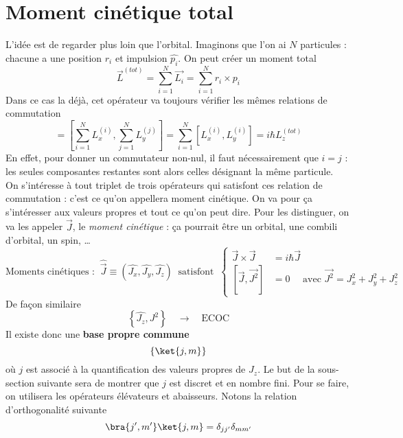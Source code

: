 \section{Moment cinétique total}
L'idée est de regarder plus loin que l'orbital. Imaginons que l'on ai $N$ particules : 
chacune a une position $\hat{r_i}$ et impulsion $\hat{p_i}$. On peut créer un moment total
\begin{equation}
\vec{L}^{(tot)} = \sum_{i=1}^N \vec{L_i} = \sum_{i=1}^N r_i\times p_i
\end{equation}
Dans ce cas la déjà, cet opérateur va toujours vérifier les mêmes relations de 
commutation
\begin{equation}
[L^{(tot)}_x,L^{(tot)}_y] = \left[ \sum_{i=1}^N L_x^{(i)}, \sum_{j=1}^N L_y^{(j)}\right] 
= \sum_{i=1}^N[L_x^{(i)},L_y^{(i)}] = i\hbar L_z^{(tot)}
\end{equation}
En effet, pour donner un commutateur non-nul, il faut nécessairement que $i=j$ : les seules 
composantes restantes sont alors celles désignant la même particule.\\


On s’intéresse à tout triplet de trois opérateurs qui satisfont ces relation 
de commutation : c'est ce qu'on appellera moment cinétique. On va pour ça 
s'intéresser aux valeurs propres et tout ce qu'on peut dire. Pour les distinguer, 
on va les appeler $\vec J$, le \textit{moment cinétique} : ça pourrait être un orbital, une 
combili d'orbital, un spin, \dots
\begin{equation}
\text{Moments cinétiques : }\ \hat{\vec{J}} \equiv (\hat{J_x},\hat{J_y},\hat{J_z})\ \text{ satisfont }\ 
\left\{\begin{array}{ll}
\vec{J}\times\vec{J} &= i\hbar\vec{J}\\
\left[\vec{J},\vec{J^2}\right] &= 0\quad \text{ avec } \vec{J^2}=J_x^2+J_y^2+J_z^2
\end{array}\right.
\end{equation}
De 	façon similaire
\begin{equation}
\left\{\hat{J_z}, J^2\right\}\quad\rightarrow\quad \text{ECOC}
\end{equation}
Il existe donc une \textbf{base propre commune}
\begin{equation}
\left\{\ket{j,m}\right\}	
\end{equation}
où $j$ est associé à la quantification des valeurs propres de $J_z$. Le but de la sous-section 
suivante sera de montrer que $j$ est discret et en nombre fini. Pour se faire, on utilisera les 
opérateurs élévateurs et abaisseurs. Notons la relation d'orthogonalité
suivante
\begin{equation}
\bra{j',m'}\ket{j,m} = \delta_{jj'}\delta_{mm'}
\end{equation}

